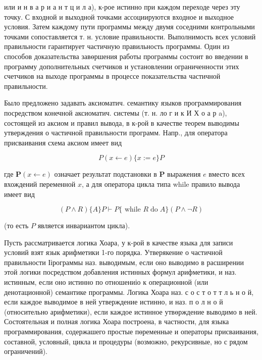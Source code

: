 \documentclass[10pt]{article}
\begin{document}
или и н в а р и а н т ц и л а), к-рое истинно при каждом переходе через эту точку. С входной и выходной точками ассоциируются входное и выходное условия. Затем каждому пути программы между двумя соседними контрольными точками сопоставляется т. н. условие правильности. Выполнимость всех условий правильности гарантирует частичную правильность программы. Один из способов доказательства завөршения работы программы состоит во введении в программу дополнительных счетчиков и установлении ограниченности этих счетчиков на выходе программы в процессе показательства частичной правильности.



Было предложено задавать аксиоматич. семантику языков программирования посредством конечной аксиоматич. системы (т. н. ло г и к И Х о а р a), состоящей из аксиом и правил вывода, в к-рой в качестве теорем выводимы утверждения о частичной правильности программ. Напр., для оператора присваивания схема аксиом имеет вид



\[

P(x \longleftarrow e)\{x:=e\} P

\]



где $\boldsymbol{P}(x \leftarrow e)$ означает результат подстановки в $\boldsymbol{P}$ выражения $e$ вместо всех вхождений переменной $x$, а для оператора цикла типа while правило вывода имеет вид



\[

(P \wedge R)\{A\} P \vdash P\{\text { while } R \operatorname{do} A\}(P \wedge \neg R)

\]



(то есть $P$ является инвариантом цикла).



Пусть рассматривается логика Хоара, у к-рой в качестве языка для записи условий взят язык арифметики 1-го порядка. Утверякение о частичной правильности Іірограммы наз. выводимым, если оно выводимо в расширении этой логики посредством добавления истинных формул арифметики, и наз. истинным, если оно истинно по отношениіо к операционной (или денотационной) семантике программы. Логика Хоара наз. с о с т о т т л ь н о й, если каждое выводимое в ней утверждение истинно, и наз. п о л н о й (относительно арифметики), если каждое истинное утвөрждение выводимо в ней. Состоятельная и полная логика Хоара построена, в частности, для языка программирования, содержашего простые пөременные и операторы присваивания, составной, условный, цикла и процедуры (возможно, рекурсивные, но с рядом ограничений).
\end{document}
